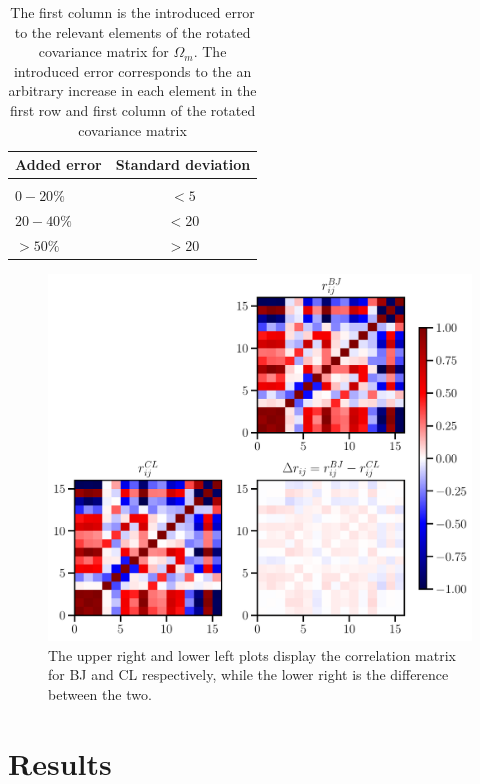 \documentclass[twocolumn]{\docclass}
\begin{document}
 
 
 \begin{table}
\centering
\begin{tabular} { l c} 
\hline
\hline
Added error	& Standard deviation 	\\ \hline \\
$0 - 20 \% $		& 	$< 5$	\\
$20 - 40 \% $		& 	$< 20$	\\
$> 50 \% $		& 	$> 20$	\\ [1ex]
\hline
\hline
\end{tabular}
\caption{The first column is the introduced error to the relevant elements of the rotated covariance matrix for $\Omega_m$. The introduced error corresponds to the an arbitrary increase in each element in the first row and first column of the rotated covariance matrix }
\label{tab:error_budget}
\end{table}





\begin{figure}
\includegraphics[width=0.9\columnwidth]{Correlation_compression.pdf}
\caption{The upper right and lower left plots display the correlation matrix for BJ and CL respectively, while the lower right is the difference between the two. \label{fig:correlation}}
\end{figure}



\section{Results}
\label{sec:results}
\end{document}
